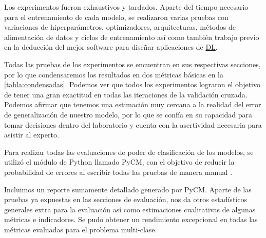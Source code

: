 Los experimentos fueron exhaustivos y tardados. Aparte del tiempo necesario para
el entrenamiento de cada modelo, se realizaron varias pruebas con variaciones de
hiperparámetros, optimizadores, arquitecturas, métodos de alimentación de datos
y ciclos de entrenamiento así como también trabajo previo en la deducción del
mejor software para diseñar aplicaciones de \hyperlink{abbr}{DL}.

Todas las pruebas de los experimentos se encuentran en sus respectivas
secciones, por lo que condensaremos los resultados en dos métricas básicas en la
\autoref{tabla:condensadas}. Podemos ver que todos los experimentos lograron el
objetivo de tener una gran exactitud en todas las iteraciones de la validación
cruzada. Podemos afirmar que tenemos una estimación muy cercana a la realidad
del error de generalización de nuestro modelo, por lo que se confía en su
capacidad para tomar decisiones dentro del laboratorio y cuenta con la
asertividad necesaria para asistir al experto.

\begin{table}[H]
    \centering
    \caption{Métricas condensadas de los experimentos}
    \label{tabla:condensadas}
\end{table}

Para realizar todas las evaluaciones de poder de clasificación de los modelos,
se utilizó el módulo de Python llamado PyCM, con el objetivo de
reducir la probabilidad de errores al escribir todas las pruebas de manera
manual \cite{Haghighi2018}.

Incluimos un reporte sumamente detallado generado por PyCM. Aparte de las
pruebas ya expuestas en las secciones de evaluación, nos da otros estadísticos
generales extra para la evaluación así como estimaciones cualitativas de algunas
métricas e indicadores. Se pudo obtener un rendimiento excepcional en todas las
métricas evaluadas para el problema multi-clase. 



